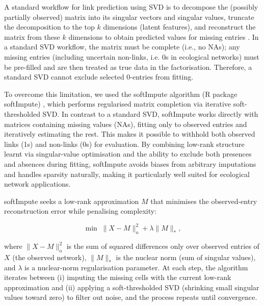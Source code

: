 \documentclass[oneside, a4paper, onecolumn, 11pt]{article}
\begin{document}
A standard workflow for link prediction using SVD is to decompose the (possibly partially observed) matrix into its singular vectors and singular values, truncate the decomposition to the top $k$ dimensions (latent features), and reconstruct the matrix from these $k$ dimensions to obtain predicted values for missing entries \citep{Strydom2023-rc}. In a standard SVD workflow, the matrix must be complete (i.e., no NAs); any missing entries (including uncertain non-links, i.e. 0s in ecological networks) must be pre-filled and are then treated as true data in the factorisation. Therefore, a standard SVD cannot exclude selected 0-entries from fitting.

To overcome this limitation, we used the softImpute algorithm (R package softImpute) \citep{Mazumder2010-hp,Hastie2022-ly,Hastie2015-qt}, which performs regularised matrix completion via iterative soft-thresholded SVD. In contrast to a standard SVD, softImpute works directly with matrices containing missing values (NAs), fitting only to observed entries and iteratively estimating the rest. This makes it possible to withhold both observed links (1s) and non-links (0s) for evaluation. By combining low-rank structure learnt via singular-value optimisation and the ability to exclude both presences and absences during fitting, softImpute avoids biases from arbitrary imputations and handles sparsity naturally, making it particularly well suited for ecological network applications.

softImpute seeks a low-rank approximation $M$ that minimises the observed-entry reconstruction error while penalising complexity:

\begin{equation}
\min \;\|X - M\|_\mathrm{o}^2 + \lambda\|M\|_*,     
\end{equation}

where $\|X - M\|_\mathrm{o}^2$ is the sum of squared differences only over observed entries of $X$ (the observed network), $\|M\|_*$ is the nuclear norm (sum of singular values), and $\lambda$ is a nuclear-norm regularisation parameter. At each step, the algorithm iterates between (i) imputing the missing cells with the current low-rank approximation and (ii) applying a soft-thresholded SVD (shrinking small singular values toward zero) to filter out noise, and the process repeats until convergence.
\end{document}
